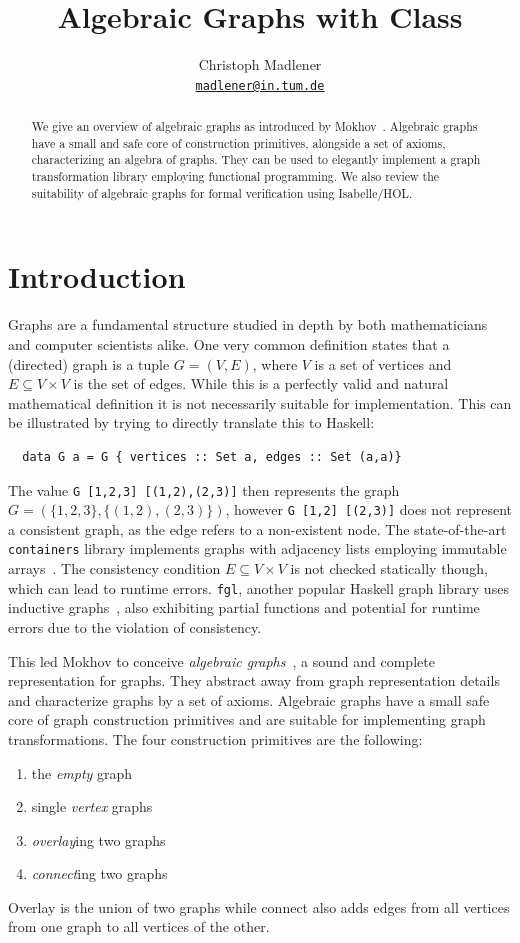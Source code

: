 \documentclass{article}
\title{Algebraic Graphs with Class}
\author{
  Christoph Madlener\\
  \texttt{\href{mailto:madlener@in.tum.de}{madlener@in.tum.de}}
}
\newcommand{\hs}{\texttt}
\begin{document}
\maketitle
\begin{abstract}
  We give an overview of algebraic graphs as introduced by
  Mokhov~\cite{mokhov2017algebraic}. Algebraic graphs have a small and safe core
  of construction primitives, alongside a set of axioms, characterizing an
  algebra of graphs. They can be used to elegantly implement a graph
  transformation library employing functional programming. We also review the
  suitability of algebraic graphs for formal verification using Isabelle/HOL.
\end{abstract}

\section{Introduction}\label{sec:intro}
Graphs are a fundamental structure studied in depth by both mathematicians and
computer scientists alike. One very common definition states that a (directed)
graph is a tuple $G = (V,E)$, where $V$ is a set of vertices and $E \subseteq V
\times V$ is the set of edges. While this is a perfectly valid and natural
mathematical definition it is not necessarily suitable for implementation. This
can be illustrated by trying to directly translate this to Haskell:
\begin{verbatim}
  data G a = G { vertices :: Set a, edges :: Set (a,a)}
\end{verbatim}
The value \hs{G [1,2,3] [(1,2),(2,3)]} then represents the graph $G =
(\{1,2,3\}, \{(1,2),(2,3)\})$, however \hs{G [1,2] [(2,3)]} does not
represent a consistent graph, as the edge refers to a non-existent node.
The state-of-the-art \texttt{containers} library implements graphs with
adjacency lists employing immutable arrays~\cite{king1995dfs}. The
consistency condition $E \subseteq V \times V$ is not checked statically though,
which can lead to runtime errors. \texttt{fgl}, another popular Haskell graph
library uses inductive graphs~\cite{erwig2001inductive}, also exhibiting partial
functions and potential for runtime errors due to the violation of consistency.

This led Mokhov to conceive \textit{algebraic
  graphs}~\cite{mokhov2017algebraic}, a sound and complete representation for
graphs. They abstract away from graph representation details and characterize
graphs by a set of axioms. Algebraic graphs have a small safe core of graph
construction primitives and are suitable for implementing graph transformations.
The four construction primitives are the following:
\begin{enumerate}
\item the \emph{empty} graph
\item single \emph{vertex} graphs
\item \emph{overlay}ing two graphs
\item \emph{connect}ing two graphs
\end{enumerate}
Overlay is the union of two graphs while connect also adds
edges from all vertices from one graph to all vertices of the other. 
\end{document}
